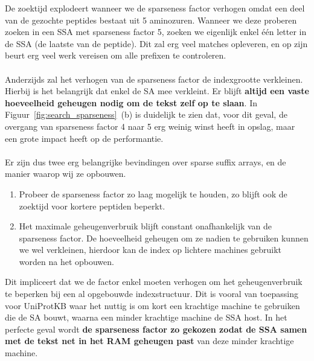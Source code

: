 De zoektijd explodeert wanneer we de sparseness factor verhogen omdat een deel van de gezochte peptides bestaat uit 5 aminozuren.
Wanneer we deze proberen zoeken in een SSA met sparseness factor 5, zoeken we eigenlijk enkel één letter in de SSA (de laatste van de peptide).
Dit zal erg veel matches opleveren, en op zijn beurt erg veel werk vereisen om alle prefixen te controleren.
\\ \\
Anderzijds zal het verhogen van de sparseness factor de indexgrootte verkleinen.
Hierbij is het belangrijk dat enkel de SA mee verkleint.
Er blijft \textbf{altijd een vaste hoeveelheid geheugen nodig om de tekst zelf op te slaan}.
In Figuur~\ref{fig:search_sparseness}~(b) is duidelijk te zien dat, voor dit geval, de overgang van sparseness factor 4 naar 5 erg weinig winst heeft in opslag, maar een grote impact heeft op de performantie.
\\ \\
Er zijn dus twee erg belangrijke bevindingen over sparse suffix arrays, en de manier waarop wij ze opbouwen.
\begin{enumerate}
    \item Probeer de sparseness factor zo laag mogelijk te houden, zo blijft ook de zoektijd voor kortere peptiden beperkt.
    \item Het maximale geheugenverbruik blijft constant onafhankelijk van de sparseness factor.
    De hoeveelheid geheugen om ze nadien te gebruiken kunnen we wel verkleinen, hierdoor kan de index op lichtere machines gebruikt worden na het opbouwen.
\end{enumerate}

Dit impliceert dat we de factor enkel moeten verhogen om het geheugenverbruik te beperken bij een al opgebouwde indexstructuur.
Dit is vooral van toepassing voor UniProtKB waar het nuttig is om kort een krachtige machine te gebruiken die de SA bouwt, waarna een minder krachtige machine de SSA host.
In het perfecte geval wordt \textbf{de sparseness factor zo gekozen zodat de SSA samen met de tekst net in het RAM geheugen past} van deze minder krachtige machine.


